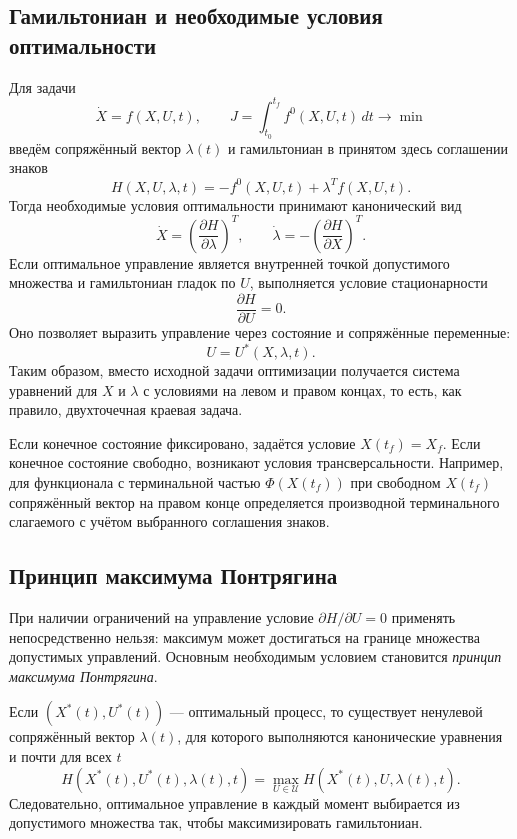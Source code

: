 \subsection{Гамильтониан и необходимые условия оптимальности}

Для задачи
\[
    \dot X=f(X,U,t),\qquad
    J=\int_{t_0}^{t_f}f^0(X,U,t)\,dt\to\min
\]
введём сопряжённый вектор $\lambda(t)$ и гамильтониан в принятом здесь
соглашении знаков
\[
    H(X,U,\lambda,t)
    =-f^0(X,U,t)+\lambda^Tf(X,U,t).
\]
Тогда необходимые условия оптимальности принимают канонический вид
\[
    \dot X=\left(\frac{\partial H}{\partial\lambda}\right)^T,
    \qquad
    \dot\lambda=-\left(\frac{\partial H}{\partial X}\right)^T.
\]
Если оптимальное управление является внутренней точкой допустимого множества и
гамильтониан гладок по $U$, выполняется условие стационарности
\[
    \frac{\partial H}{\partial U}=0.
\]
Оно позволяет выразить управление через состояние и сопряжённые переменные:
\[
    U=U^*(X,\lambda,t).
\]
Таким образом, вместо исходной задачи оптимизации получается система уравнений
для $X$ и $\lambda$ с условиями на левом и правом концах, то есть, как правило,
двухточечная краевая задача.

Если конечное состояние фиксировано, задаётся условие $X(t_f)=X_f$. Если
конечное состояние свободно, возникают условия трансверсальности. Например,
для функционала с терминальной частью $\Phi(X(t_f))$ при свободном $X(t_f)$
сопряжённый вектор на правом конце определяется производной терминального
слагаемого с учётом выбранного соглашения знаков.

\subsection{Принцип максимума Понтрягина}

При наличии ограничений на управление условие
$\partial H/\partial U=0$ применять непосредственно нельзя: максимум может
достигаться на границе множества допустимых управлений. Основным необходимым
условием становится \emph{принцип максимума Понтрягина}.

Если $(X^*(t),U^*(t))$ --- оптимальный процесс, то существует ненулевой
сопряжённый вектор $\lambda(t)$, для которого выполняются канонические
уравнения и почти для всех $t$
\[
    H(X^*(t),U^*(t),\lambda(t),t)
    =\max_{U\in\mathcal U}
      H(X^*(t),U,\lambda(t),t).
\]
Следовательно, оптимальное управление в каждый момент выбирается из допустимого
множества так, чтобы максимизировать гамильтониан.

